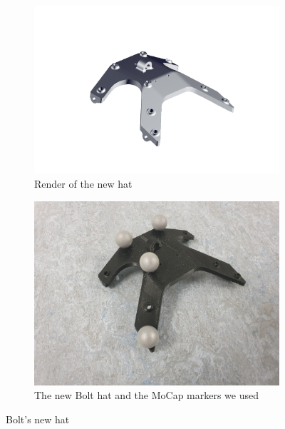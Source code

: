 \documentclass[a4paper,10pt]{article}
\begin{document}
\begin{figure}[H]
\centering

\begin{subfigure}{.5\textwidth}
\centering
  \includegraphics[width=1\linewidth, angle=0, scale=1.2]{./images/render_top.png}
  \caption{Render of the new hat}
\end{subfigure}%
\begin{subfigure}{.5\textwidth}
\centering
  \includegraphics[width=\linewidth, angle=0, scale=0.9]{./images/Bolt_hat.jpg}
  \caption{The new Bolt hat and the MoCap markers we used}
\end{subfigure}
\caption{Bolt's new hat}
\label{Bolt new leg}
\end{figure}
\end{document}
